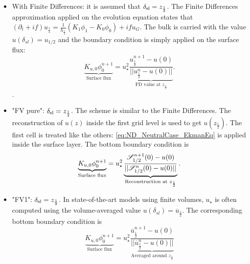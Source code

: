   \begin{itemize}
	  \item With Finite Differences:
		  it is assumed that
		  $\delta_{\rm sl} = z_{\frac{1}{2}}$.
		The Finite Differences approximation applied on
		  the evolution equation states that
		  $(\partial_t+if) u_{\frac{1}{2}}
		  =\frac{1}{h_{\frac{1}{2}}}(K_1\phi_1 - K_0\phi_0)
		  + if u_G$.
		  The bulk is carried with the value
		  $u(\delta_{sl}) = u_{1/2}$ and the boundary
		  condition is simply applied on the surface flux:
		\begin{equation}
		\underbrace{K_{u,0} \phi_0^{n+1}}_{\text{Surface flux}}
		= u_\star^2 
			\underbrace{\frac{u_{\frac{1}{2}}^{n+1} - u(0)}
			{||u_{\frac{1}{2}}^n - u(0)||}}_{
			  \text{FD value at } z_{\frac{1}{2}}
		  }.
		\end{equation}
		  .
	  \item "FV pure": $\delta_{\rm sl} = z_{\frac{1}{2}}$.
		  The scheme is similar to the Finite Differences.
	    The reconstruction of $u(z)$ inside the first grid level
		  is used to get $u(z_{\frac{1}{2}})$.
		  The first cell is treated like the others:
		  \eqref{eq:ND_NeutralCase_EkmanEq} is
		  applied inside the surface layer.
	The bottom boundary condition is
	\begin{equation}
		\underbrace{K_{u,0} \phi_0^{n+1}}_{\text{Surface flux}}
		= u_\star^2 
		  \underbrace{\frac{{\cal S}_{1/2}^{n+1}(0) - u(0)}
		  {||{\cal S}_{1/2}^n(0) - u(0)||}}_{
			  \text{Reconstruction at } z_{\frac{1}{2}}
		  }.
	\end{equation}
	  \item "FV1": $\delta_{\rm sl} = z_{\frac{1}{2}}$.
		  In state-of-the-art models using finite volumes,
		  $u_{\star}$ is often computed using the
		  volume-averaged value
		  $u(\delta_{sl}) = \overline{u}_{\frac{1}{2}}$.
		The corresponding bottom boundary condition is
		  \begin{equation}
	\underbrace{K_{u,0} \phi_0^{n+1}}_{\text{Surface flux}}
			  = u_\star^2 
			  \underbrace{\frac{
				  \overline{u}^{n+1}_{\frac{1}{2}}
				  -u(0)}
			  {||\overline{u}_{\frac{1}{2}}^n - u(0)||}
			  }_{\text{Averaged around } z_{\frac{1}{2}}
			  }
		  \end{equation}


\end{itemize}
